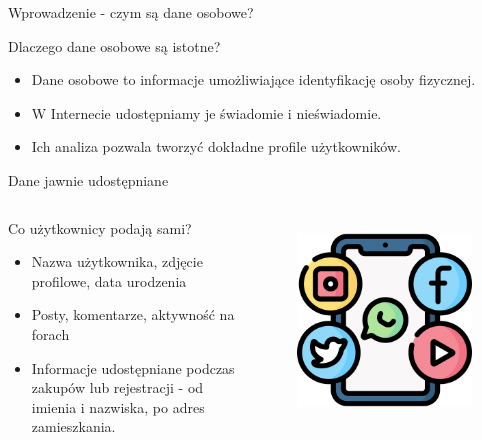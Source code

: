 
\begin{frame}{Wprowadzenie - czym są dane osobowe?}
    \begin{alertblock}{Dlaczego dane osobowe są istotne?}
      \begin{itemize}
        \item Dane osobowe to informacje umożliwiające identyfikację osoby fizycznej.\cite{PII_USDE}
        \item W Internecie udostępniamy je świadomie i nieświadomie.
        \item Ich analiza pozwala tworzyć dokładne profile użytkowników.
      \end{itemize}
    \end{alertblock}
  \end{frame}
  
  
  \begin{frame}{Dane jawnie udostępniane}
  \begin{columns}[c]
      \begin{alertblock}{Co użytkownicy podają sami?}
        \begin{itemize}
          \item Nazwa użytkownika, zdjęcie profilowe, data urodzenia
          \item Posty, komentarze, aktywność na forach
          \item Informacje udostępniane podczas zakupów lub rejestracji - od imienia i nazwiska, po adres zamieszkania.\cite{CYB_DEF_NAJCZĘSTRZE_DANE}
        \end{itemize}
      \end{alertblock}
      \begin{figure}
        \centering
        \includegraphics[height=0.45\textheight]{images/social-media.png}
        \label{fig:social-media}
      \end{figure}
  \end{columns}
  \end{frame}
  
